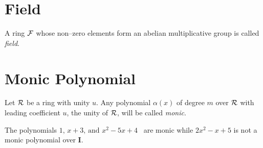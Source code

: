 \documentclass[a4paper,11pt]{article} %
\theoremstyle{plain} %
{\theorembodyfont{\normalfont}
\newtheorem{Exa}{Example}}
\newcommand{\matr}[1]{\mathbf{#1}}
\begin{document}
\section{Field}
A ring $\cal F$ whose non--zero elements form an abelian
multiplicative group is called {\em field}. \cite[p.118]{algebra1}

\section{Monic Polynomial}
Let $\cal R$ be a ring with unity $u$. Any polynomial $\alpha(x)$ of degree $m$ over $\cal R$ with leading coefficient $u$, the unity of $\cal R$, will be called {\em monic}.\cite[p.126]{algebra1}
\begin{Exa}
 The polynomials $1,\, x+3 ,\, \text{and~} x^2-5x+4$ ~are monic while $2x^2-x+5$ is not a monic polynomial over $\matr{I}$.
\end{Exa}

\vspace{3\baselineskip}



\end{document}
